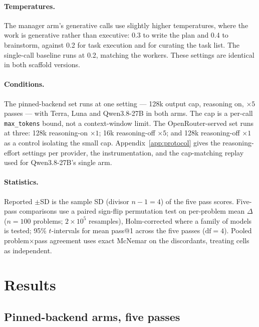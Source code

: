 \documentclass{article}
\begin{document}
\paragraph{Temperatures.} The manager arm's generative calls use slightly higher temperatures,
where the work is generative rather than executive: 0.3 to write the plan and 0.4 to brainstorm,
against 0.2 for task execution and for curating the task list. The single-call baseline runs at
0.2, matching the workers. These settings are identical in both scaffold versions.

\paragraph{Conditions.} The pinned-backend set runs at one setting --- 128k output cap,
reasoning on, $\times 5$ passes --- with Terra, Luna and Qwen3.8-27B in both arms. The cap is
a per-call \texttt{max\_tokens} bound, not a context-window limit. The OpenRouter-served set
runs at three: 128k reasoning-on $\times 1$; 16k reasoning-off $\times 5$; and 128k
reasoning-off $\times 1$ as a control isolating the small cap. Appendix~\ref{app:protocol}
gives the reasoning-effort settings per provider, the instrumentation, and the cap-matching
replay used for Qwen3.8-27B's single arm.

\paragraph{Statistics.} Reported $\pm$SD is the sample SD (divisor $n-1 = 4$) of the five
pass scores. Five-pass comparisons use a paired sign-flip permutation test on per-problem
mean $\Delta$ ($n = 100$ problems; $2\times10^{5}$ resamples), Holm-corrected where a family
of models is tested; 95\% $t$-intervals for mean pass@1 across the five passes
($\mathrm{df} = 4$). Pooled problem$\times$pass agreement uses exact McNemar on the
discordants, treating cells as independent.

\section{Results}
\label{sec:results}

\subsection{Pinned-backend arms, five passes}
\label{sec:pinned}


\end{document}
